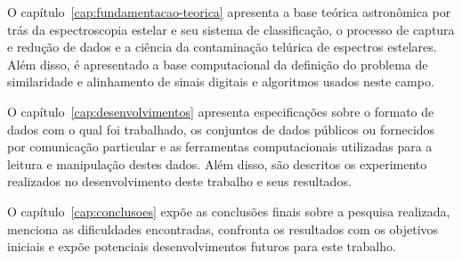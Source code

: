 O capítulo~\ref{cap:fundamentacao-teorica} apresenta a base teórica astronômica por trás da espectroscopia estelar e seu sistema de classificação, o processo de captura e redução de dados e a ciência da contaminação telúrica de espectros estelares. Além disso, é apresentado a base computacional da definição do problema de similaridade e alinhamento de sinais digitais e algoritmos usados neste campo.

O capítulo~\ref{cap:desenvolvimentos} apresenta especificações sobre o formato de dados com o qual foi trabalhado, os conjuntos de dados públicos ou fornecidos por comunicação particular e as ferramentas computacionais utilizadas para a leitura e manipulação destes dados. Além disso, são descritos os experimento realizados no desenvolvimento deste trabalho e seus resultados.

O capítulo~\ref{cap:conclusoes} expõe as conclusões finais sobre a pesquisa realizada, menciona as dificuldades encontradas, confronta os resultados com os objetivos iniciais e expõe potenciais desenvolvimentos futuros para este trabalho.

